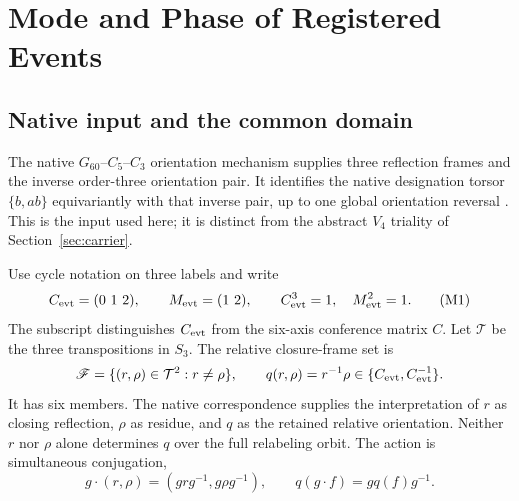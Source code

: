 \begingroup
\renewcommand{\thesection}{13A}
\section{Mode and Phase of Registered Events}\label{sec:mode}
\subsection*{Native input and the common domain}
The native $G_{60}$--$C_5$--$C_3$ orientation mechanism supplies three reflection frames and the inverse order-three orientation pair. It identifies the native designation torsor $\{b,ab\}$ equivariantly with that inverse pair, up to one global orientation reversal \citep[Secs.~8--10]{cave2026orientation}. This is the input used here; it is distinct from the abstract $V_4$ triality of Section~\ref{sec:carrier}.

Use cycle notation on three labels and write
\begin{equation}
C_{\mathrm{evt}}=(0\ 1\ 2),\qquad M_{\mathrm{evt}}=(1\ 2),\qquad
C_{\mathrm{evt}}^3=1,\quad M_{\mathrm{evt}}^2=1.
\tag{M1}\label{eq:modalgenerators}
\end{equation}
The subscript distinguishes $C_{\mathrm{evt}}$ from the six-axis conference matrix $C$. Let $\mathcal T$ be the three transpositions in $S_3$. The relative closure-frame set is
\[
\mathscr F=\{(r,\rho)\in\mathcal T^2:r\neq\rho\},\qquad
q(r,\rho)=r^{-1}\rho\in\{C_{\mathrm{evt}},C_{\mathrm{evt}}^{-1}\}.
\]
It has six members. The native correspondence supplies the interpretation of $r$ as closing reflection, $\rho$ as residue, and $q$ as the retained relative orientation. Neither $r$ nor $\rho$ alone determines $q$ over the full relabeling orbit. The action is simultaneous conjugation,
\[
g\cdot(r,\rho)=(grg^{-1},g\rho g^{-1}),
\qquad q(g\cdot f)=gq(f)g^{-1}.
\]

